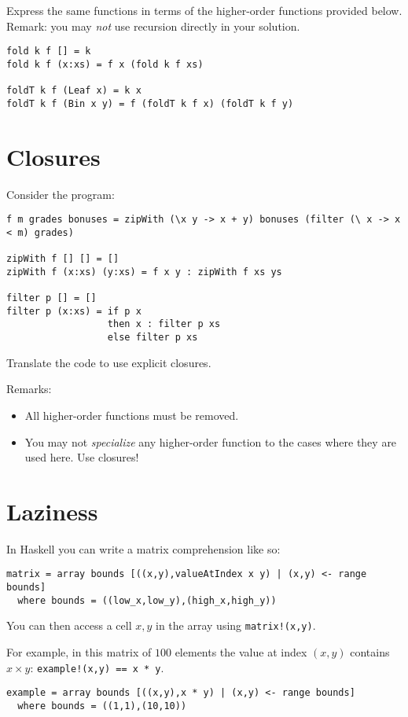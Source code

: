 \documentclass{article}
\begin{document}
Express the same functions in terms of the higher-order functions
provided below.  Remark: you may \emph{not} use recursion directly in
your solution.

\begin{verbatim}
fold k f [] = k
fold k f (x:xs) = f x (fold k f xs)

foldT k f (Leaf x) = k x
foldT k f (Bin x y) = f (foldT k f x) (foldT k f y)
\end{verbatim}

\section{Closures}

Consider the program:
\begin{verbatim}
f m grades bonuses = zipWith (\x y -> x + y) bonuses (filter (\ x -> x < m) grades)

zipWith f [] [] = []
zipWith f (x:xs) (y:xs) = f x y : zipWith f xs ys

filter p [] = []
filter p (x:xs) = if p x
                  then x : filter p xs
                  else filter p xs
\end{verbatim}

Translate the code to use explicit closures. 

Remarks:
\begin{itemize}
\item All higher-order functions must be removed.
\item You may not \emph{specialize} any higher-order function to the
  cases where they are used here. Use closures!
\end{itemize}

\newpage
\section{Laziness}

In Haskell you can write a matrix comprehension like so:
\begin{verbatim}
matrix = array bounds [((x,y),valueAtIndex x y) | (x,y) <- range bounds]
  where bounds = ((low_x,low_y),(high_x,high_y))
\end{verbatim}

You can then access a cell $x,y$ in the array using \texttt{matrix!(x,y)}.

For example, in this matrix of $100$ elements the value at index $(x,y)$ contains $x ×
y$: \texttt{example!(x,y) == x * y}.
\begin{verbatim}
example = array bounds [((x,y),x * y) | (x,y) <- range bounds]
  where bounds = ((1,1),(10,10))
\end{verbatim}
\end{document}
